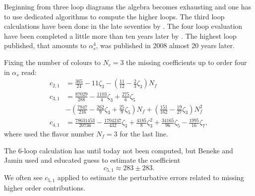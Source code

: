 \documentclass[../../index.tex]{subfiles}
\begin{document}
Beginning from three loop diagrams the algebra becomes exhausting and one has to
use dedicated algorithms to compute the higher loops. The third loop
calculations have been done in the late seventies by
\cite{Chetyrkin1979,Dine1979,Celmaster1979}. The four loop evaluation have been
completed a little more than ten years later by
\cite{Gorishnii1990,Surguladze1990}. The highest loop published, that amounts to
\(\alpha_s^4\), was published in 2008 \cite{Baikov2008} almost 20 years later.

Fixing the number of colours to \(N_c=3\) the missing coefficients up to order
four in \(\alpha_s\) read:
\begin{equation}
  \label{eq:adlerCoefficients}
  \begin{split}
    c_{2,1} &= \frac{365}{24} - 11 \zeta_3 - \left( \frac{11}{12} - \frac{2}{3}\zeta_3 \right) N_f \\
    c_{3,1} &= \frac{87029}{288} - \frac{1103}{4} \zeta_3 + \frac{275}{6}\zeta_5 \\
    &- \left( \frac{7847}{216} - \frac{262}{9} \zeta_3 + \frac{25}{9} \zeta_5 \right) N_f + \left( \frac{151}{162} - \frac{19}{27}\zeta_3\right)N_f^2 \\
    c_{4,1} &= \frac{78631453}{20736} - \frac{1704247}{432}\zeta_3 +
    \frac{4185}{8}\zeta_3^2 + \frac{34165}{96}\zeta_5 - \frac{1995}{16}\zeta_7,
  \end{split}
\end{equation}
where used the flavor number \(N_f=3\) for the last line.

The 6-loop calculation has until today not been computed, but Beneke and Jamin
\cite{Beneke2008} used and educated guess to estimate the coefficient
\begin{equation}
  c_{5,1} \approx 283 \pm 283.
\end{equation}
We often see \(c_{5,1}\) applied to estimate the perturbative errors related to
missing higher order contributions.
\end{document}
